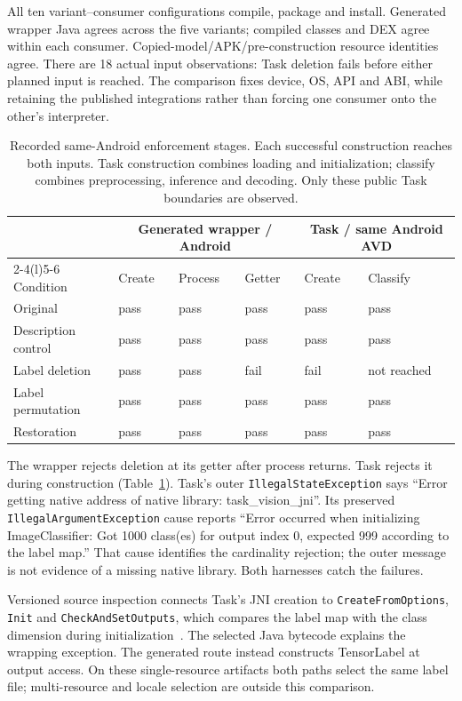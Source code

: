 \documentclass[10pt,conference]{IEEEtran}
\newcommand{\code}[1]{\texttt{#1}}
\begin{document}
All ten variant--consumer configurations compile, package and install. Generated wrapper Java agrees across the five variants; compiled classes and DEX agree within each consumer. Copied-model/APK/pre-construction resource identities agree. There are 18 actual input observations: Task deletion fails before either planned input is reached. The comparison fixes device, OS, API and ABI, while retaining the published integrations rather than forcing one consumer onto the other's interpreter.

\begin{table}[t]
\caption{Recorded same-Android enforcement stages. Each successful construction reaches both inputs. Task construction combines loading and initialization; classify combines preprocessing, inference and decoding. Only these public Task boundaries are observed.}
\label{tab:stages}
\centering\small
\setlength{\tabcolsep}{9pt}
\begin{tabular}{@{}llllll@{}}
\toprule
 & \multicolumn{3}{c}{Generated wrapper / Android} & \multicolumn{2}{c}{Task / same Android AVD}\\
\cmidrule(lr){2-4}\cmidrule(l){5-6}
Condition & Create & Process & Getter & Create & Classify\\
\midrule
Original & pass & pass & pass & pass & pass\\
Description control & pass & pass & pass & pass & pass\\
Label deletion & pass & pass & fail & fail & not reached\\
Label permutation & pass & pass & pass & pass & pass\\
Restoration & pass & pass & pass & pass & pass\\
\bottomrule
\end{tabular}
\end{table}

The wrapper rejects deletion at its getter after process returns. Task rejects it during construction (Table~\ref{tab:stages}). Task's outer \code{IllegalStateException} says ``Error getting native address of native library: task\_vision\_jni''. Its preserved \code{IllegalArgumentException} cause reports ``Error occurred when initializing ImageClassifier: Got 1000 class(es) for output index 0, expected 999 according to the label map.'' That cause identifies the cardinality rejection; the outer message is not evidence of a missing native library. Both harnesses catch the failures.

Versioned source inspection connects Task's JNI creation to \code{CreateFromOptions}, \code{Init} and \code{CheckAndSetOutputs}, which compares the label map with the class dimension during initialization~\cite{task-classifier}. The selected Java bytecode explains the wrapping exception. The generated route instead constructs TensorLabel at output access. On these single-resource artifacts both paths select the same label file; multi-resource and locale selection are outside this comparison.
\end{document}
